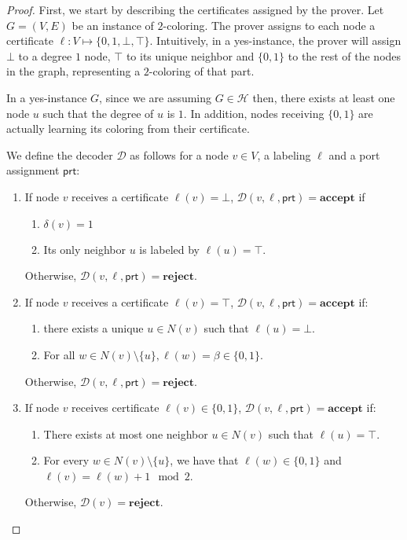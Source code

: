 \documentclass[11pt]{article}
\newcommand*{\ports}{\mathsf{prt}}
\begin{document}
\begin{proof}
First, we start by describing the certificates assigned by the prover. Let $G=(V,E)$ be an instance of $2$-coloring. The prover assigns to each node a certificate $\ell:V \mapsto \{0,1,\bot, \top\}$. Intuitively, in a yes-instance, the prover will assign $\bot$ to a degree $1$ node, $\top$ to its unique neighbor and $\{0,1\}$ to the rest of the nodes in the graph, representing a $2$-coloring of that part. 



In a yes-instance $G$, since we are assuming $G \in \mathcal{H}$ then, there exists at least one node $u$ such that the degree of $u$ is $1$. In addition, nodes receiving $\{0,1\}$ are actually learning its coloring from their certificate.

We define the decoder $\mathcal{D}$ as follows for a node $v \in V$, a labeling $\ell$ and a port assignment $\ports$:
\begin{enumerate}
    \item If node $v$ receives a certificate $\ell(v) = \bot$,   $\mathcal{D}(v,\ell,\ports) = \textbf{accept}$ if
    \begin{enumerate}
        \item $\delta(v) = 1$ 
        \item Its only neighbor $u$ is labeled by $\ell(u) = \top$.
    \end{enumerate} Otherwise, $\mathcal{D}(v,\ell,\ports)= \textbf{reject.}$
    \item If node $v$ receives a certificate $\ell(v) = \top$, $\mathcal{D}(v,\ell,\ports) = \textbf{accept}$ if:
    \begin{enumerate}
        \item there exists a unique $u \in N(v)$ such that $\ell(u) = \bot$.
        \item For all $w \in N(v) \setminus \{u\}, \ell(w) = \beta \in \{0,1\}$. 
    \end{enumerate}  Otherwise, $\mathcal{D}(v,\ell,\ports)= \textbf{reject.}$
    \item If node $v$  receives certificate $\ell(v) \in \{0,1\}$,  $\mathcal{D}(v,\ell,\ports) = \textbf{accept}$ if:
    \begin{enumerate}
        \item There exists at most one neighbor $u \in N(v)$ such that $\ell(u) = \top$.
        \item For every $w \in N(v) \setminus \{u\}$, we have that $\ell(w) \in \{0,1\}$ and $\ell(v) = \ell(w) +1 \mod 2$. 
    \end{enumerate}
Otherwise, $\mathcal{D}(v)= \textbf{reject.}$
\end{enumerate}


\end{proof}
\end{document}
